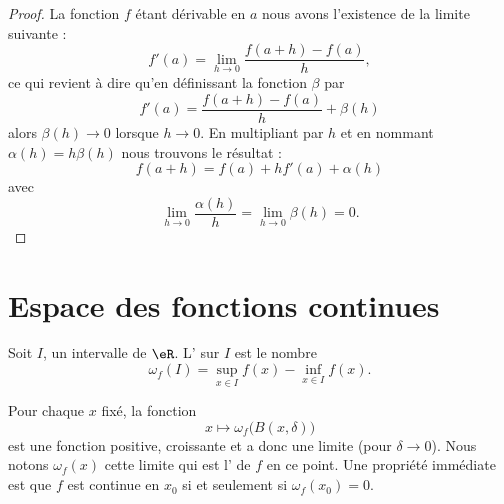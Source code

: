\begin{proof}
    La fonction \( f\) étant dérivable en \( a\) nous avons l'existence de la limite suivante :
    \begin{equation}
        f'(a)=\lim_{h\to 0} \frac{ f(a+h)-f(a) }{ h },
    \end{equation}
    ce qui revient à dire qu'en définissant la fonction \( \beta\) par
    \begin{equation}
        f'(a)=\frac{ f(a+h)-f(a) }{ h }+\beta(h)
    \end{equation}
    alors \( \beta(h)\to 0\) lorsque \( h\to 0\). En multipliant par \( h\) et en nommant \( \alpha(h)=h\beta(h)\) nous trouvons le résultat :
    \begin{equation}
        f(a+h)=f(a)+hf'(a)+\alpha(h)
    \end{equation}
    avec 
    \begin{equation}
        \lim_{h\to 0} \frac{ \alpha(h) }{ h }=\lim_{h\to 0} \beta(h)=0.
    \end{equation}
\end{proof}

\section{Espace des fonctions continues}

\begin{definition}
    Soit \( I\), un intervalle de \( \eR\). L' sur \( I\) est le nombre
    \begin{equation}
        \omega_f(I)=\sup_{x\in I}f(x)-\inf_{x\in I}f(x).
    \end{equation}
\end{definition}
    Pour chaque \( x\) fixé, la fonction
    \begin{equation}
        x\mapsto \omega_f\big( B(x,\delta) \big)
    \end{equation}
    est une fonction positive, croissante et a donc une limite (pour \( \delta\to 0\)). Nous notons \( \omega_f(x)\) cette limite qui est l' de \( f\) en ce point. Une propriété immédiate est que \( f\) est continue en \( x_0\) si et seulement si \( \omega_f(x_0)=0\).

